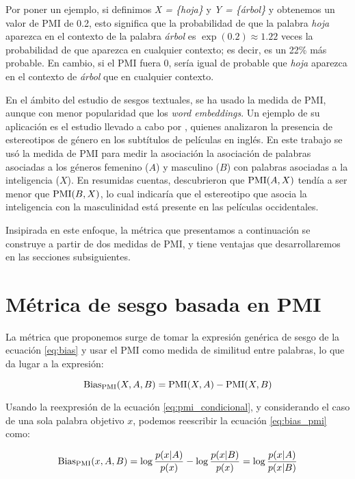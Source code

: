 Por poner un ejemplo, si definimos \emph{X = \{hoja\}} y \emph{Y = \{árbol\}} y obtenemos un valor de PMI de 0.2, esto significa que la probabilidad de que la palabra \emph{hoja} aparezca en el contexto de la palabra \emph{árbol} es $\exp(0.2) \approx 1.22$ veces la probabilidad de que aparezca en cualquier contexto; es decir, es un 22\% más probable. En cambio, si el PMI fuera 0, sería igual de probable que \emph{hoja} aparezca en el contexto de \emph{árbol} que en cualquier contexto.

En el ámbito del estudio de sesgos textuales, se ha usado la medida de PMI, aunque con menor popularidad que los \emph{word embeddings}. Un ejemplo de su aplicación es el estudio llevado a cabo por \citet{galvez2018half}, quienes analizaron la presencia de estereotipos de género en los subtítulos de películas en inglés. En este trabajo se usó la medida de PMI para medir la asociación la asociación de palabras asociadas a los géneros femenino ($A$) y masculino ($B$) con palabras asociadas a la inteligencia ($X$). En resumidas cuentas, descubrieron que $\operatorname{PMI}(A,X)$ tendía a ser menor que $\operatorname{PMI}(B,X)$, lo cual indicaría que el estereotipo que asocia la inteligencia con la masculinidad está presente en las películas occidentales.

Insipirada en este enfoque, la métrica que presentamos a continuación se construye a partir de dos medidas de PMI, y tiene ventajas que desarrollaremos en las secciones subsiguientes.

\section{Métrica de sesgo basada en PMI} \label{sec:bias_pmi}


La métrica que proponemos surge de tomar la expresión genérica de sesgo de la ecuación \ref{eq:bias} y usar el PMI como medida de similitud entre palabras, lo que da lugar a la expresión:

\begin{equation}\label{eq:bias_pmi}
    \operatorname{Bias_{PMI}}(X,A,B) = \operatorname{PMI}(X,A) - \operatorname{PMI}(X,B)
\end{equation}

Usando la reexpresión de la ecuación \ref{eq:pmi_condicional}, y considerando el caso de una sola palabra objetivo $x$, podemos reescribir la ecuación \ref{eq:bias_pmi} como:

\begin{equation}\label{eq:bias_pmi_condicional}
    \operatorname{Bias_{PMI}}(x,A,B)
        = \log \frac{p(x|A)}{p(x)} - \log \frac{p(x|B)}{p(x)}
        = \log \frac{p(x|A)}{p(x|B)}
\end{equation}

